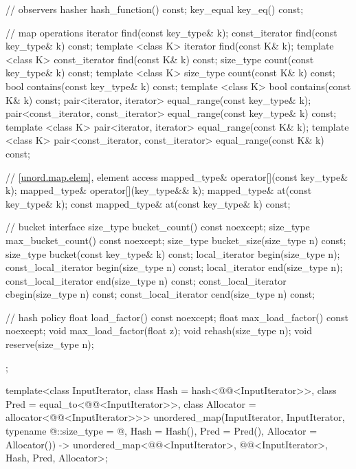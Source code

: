 \begin{codeblock}
{{    // observers
    hasher hash_function() const;
    key_equal key_eq() const;

    // map operations
    iterator         find(const key_type& k);
    const_iterator   find(const key_type& k) const;
    template <class K>
      iterator       find(const K& k);
    template <class K>
      const_iterator find(const K& k) const;
    size_type        count(const key_type& k) const;
    template <class K>
      size_type      count(const K& k) const;
    bool             contains(const key_type& k) const;
    template <class K>
      bool           contains(const K& k) const;
    pair<iterator, iterator>               equal_range(const key_type& k);
    pair<const_iterator, const_iterator>   equal_range(const key_type& k) const;
    template <class K>
      pair<iterator, iterator>             equal_range(const K& k);
    template <class K>
      pair<const_iterator, const_iterator> equal_range(const K& k) const;

    // \ref{unord.map.elem}, element access
    mapped_type& operator[](const key_type& k);
    mapped_type& operator[](key_type&& k);
    mapped_type& at(const key_type& k);
    const mapped_type& at(const key_type& k) const;

    // bucket interface
    size_type bucket_count() const noexcept;
    size_type max_bucket_count() const noexcept;
    size_type bucket_size(size_type n) const;
    size_type bucket(const key_type& k) const;
    local_iterator begin(size_type n);
    const_local_iterator begin(size_type n) const;
    local_iterator end(size_type n);
    const_local_iterator end(size_type n) const;
    const_local_iterator cbegin(size_type n) const;
    const_local_iterator cend(size_type n) const;

    // hash policy
    float load_factor() const noexcept;
    float max_load_factor() const noexcept;
    void max_load_factor(float z);
    void rehash(size_type n);
    void reserve(size_type n);
  };

  template<class InputIterator,
           class Hash = hash<@@<InputIterator>>,
           class Pred = equal_to<@@<InputIterator>>,
           class Allocator = allocator<@@<InputIterator>>>
    unordered_map(InputIterator, InputIterator, typename @\seebelow@::size_type = @\seebelow@,
                  Hash = Hash(), Pred = Pred(), Allocator = Allocator())
      -> unordered_map<@@<InputIterator>, @@<InputIterator>, Hash, Pred,
                       Allocator>;

}
\end{codeblock}
